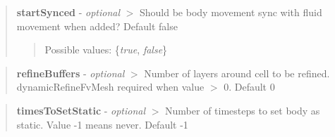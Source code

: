 \begin{quote}
{\bfseries{start\+Synced}} -\/ {\itshape optional} $>$ Should be body movement sync with fluid movement when added? Default false \begin{quote}
Possible values\+: \{{\itshape true}, {\itshape false}\} \end{quote}
\end{quote}


\begin{quote}
{\bfseries{refine\+Buffers}} -\/ {\itshape optional} $>$ Number of layers around cell to be refined. dynamic\+Refine\+Fv\+Mesh required when value $>$ 0. Default 0 \end{quote}


\begin{quote}
{\bfseries{times\+To\+Set\+Static}} -\/ {\itshape optional} $>$ Number of timesteps to set body as static. Value -\/1 means never. Default -\/1 \end{quote}
